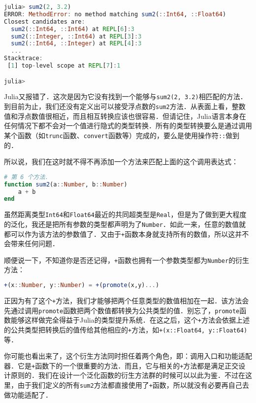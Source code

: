 \begin{lstlisting}[language=julia]
julia> sum2(2, 3.2)
ERROR: MethodError: no method matching sum2(::Int64, ::Float64)
Closest candidates are:
  sum2(::Int64, ::Int64) at REPL[6]:3
  sum2(::Integer, ::Int64) at REPL[3]:3
  sum2(::Int64, ::Integer) at REPL[4]:3
  ...
Stacktrace:
 [1] top-level scope at REPL[7]:1

julia> 
\end{lstlisting}

Julia又报错了．这次是因为它没有找到一个能够与\verb|sum2(2, 3.2)|相匹配的方法．到目前为止，我们还没有定义出可以接受浮点数的\verb|sum2|方法．从表面上看，整数值和浮点数值很相近，而且相互转换应该也很容易．但请记住，Julia语言本身在任何情况下都不会对一个值进行隐式的类型转换．所有的类型转换要么是通过调用某个函数（如\verb|trunc|函数、\verb|convert|函数等）完成的，要么是使用操作符\verb|::|做到的．

所以说，我们在这时就不得不再添加一个方法来匹配上面的这个调用表达式：

\begin{lstlisting}[language=julia]
# 第 6 个方法．
function sum2(a::Number, b::Number)
    a + b
end
\end{lstlisting}

虽然距离类型\verb|Int64|和\verb|Float64|最近的共同超类型是\verb|Real|，但是为了做到更大程度的泛化，我还是把所有参数的类型都声明为了\verb|Number|．如此一来，任意的数值就都可以作为该方法的参数值了．又由于\verb|+|函数本身就支持所有的数值，所以这并不会带来任何问题．

顺便说一下，不知道你是否还记得，\verb|+|函数也拥有一个参数类型都为\verb|Number|的衍生方法：

\begin{lstlisting}[language=julia]
+(x::Number, y::Number) = +(promote(x,y)...)
\end{lstlisting}

正因为有了这个\verb|+|方法，我们才能够把两个任意类型的数值相加在一起．该方法会先通过调用\verb|promote|函数把两个数值都转换为公共类型的值．别忘了，\verb|promote|函数能够这样做完全得益于Julia的类型提升系统．在这之后，这个\verb|+|方法会依据上述的公共类型把转换后的值传给其他相应的\verb|+|方法，如\verb|+(x::Float64, y::Float64)|等．

你可能也看出来了，这个衍生方法同时担任着两个角色，即：调用入口和功能适配器．它是\verb|+|函数下的一个很重要的方法．而且，它与相关的\verb|+|方法都是满足正交设计原则的．我们在设计一个泛化函数的衍生方法群的时候可以以此为鉴．不过在这里，由于我们定义的所有\verb|sum2|方法都直接使用了\verb|+|函数，所以就没有必要再自己去做功能适配了．

